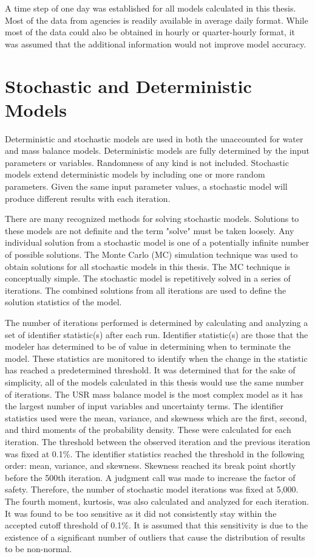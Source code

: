 A time step of one day was established for all models calculated in this thesis.  Most of the data from agencies is readily available in average daily format.  While most of the data could also be obtained in hourly or quarter-hourly format, it was assumed that the additional information would not improve model accuracy.

\clearpage{}
\section{Stochastic and Deterministic Models}
\label{sec:StochAndDetermModels}

Deterministic and stochastic models are used in both the unaccounted for water and mass balance models.  Deterministic models are fully determined by the input parameters or variables.  Randomness of any kind is not included.  Stochastic models extend deterministic models by including one or more random parameters.  Given the same input parameter values, a stochastic model will produce different results with each iteration.

There are many recognized methods for solving stochastic models.  Solutions to these models are not definite and the term "solve" must be taken loosely.  Any individual solution from a stochastic model is one of a potentially infinite number of possible solutions.  The Monte Carlo (MC) simulation technique was used to obtain solutions for all stochastic models in this thesis.  The MC technique is conceptually simple.  The stochastic model is repetitively solved in a series of iterations.  The combined solutions from all iterations are used to define the solution statistics of the model.  

The number of iterations performed is determined by calculating and analyzing a set of identifier statistic(s) after each run.  Identifier statistic(s) are those that the modeler has determined to be of value in determining when to terminate the model.  These statistics are monitored to identify when the change in the statistic has reached a predetermined threshold.  It was determined that for the sake of simplicity, all of the models calculated in this thesis would use the same number of iterations.  The USR mass balance model is the most complex model as it has the largest number of input variables and uncertainty terms.  The identifier statistics used were the mean, variance, and skewness which are the first, second, and third moments of the probability density.  These were calculated for each iteration.  The threshold between the observed iteration and the previous iteration was fixed at 0.1\%.  The identifier statistics reached the threshold in the following order: mean, variance, and skewness.  Skewness reached its break point shortly before the 500th iteration.  A judgment call was made to increase the factor of safety.  Therefore, the number of stochastic model iterations was fixed at 5,000.  The fourth moment, kurtosis, was also calculated and analyzed for each iteration.  It was found to be too sensitive as it did not consistently stay within the accepted cutoff threshold of 0.1\%.  It is assumed that this sensitivity is due to the existence of a significant number of outliers that cause the distribution of results to be non-normal.

